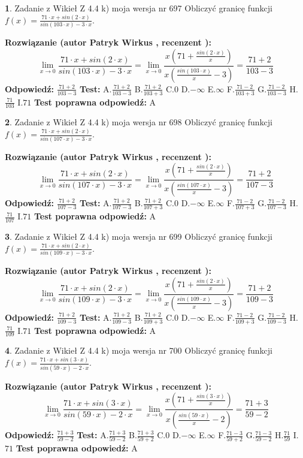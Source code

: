 \documentclass[12pt, a4paper]{article}
\theoremstyle{definition} %
\newtheorem{zad}{}
\newcommand{\zadStart}[1]{\begin{zad}#1\newline}
\newcommand{\zadStop}{\end{zad}}
\newcommand{\rozwStart}[2]{\noindent \textbf{Rozwiązanie (autor #1 , recenzent #2): }\newline}
\newcommand{\rozwStop}{\newline}
\newcommand{\odpStart}{\noindent \textbf{Odpowiedź:}\newline}
\newcommand{\odpStop}{\newline}
\newcommand{\testStart}{\noindent \textbf{Test:}\newline}
\newcommand{\testStop}{\newline}
\newcommand{\kluczStart}{\noindent \textbf{Test poprawna odpowiedź:}\newline}
\newcommand{\kluczStop}{\newline}
\begin{document}
\zadStart{Zadanie z Wikieł Z 4.4 k) moja wersja nr 697}
Obliczyć granicę funkcji $f(x)=\frac{71\cdot x +sin(2\cdot x)}{sin(103\cdot x) -3\cdot x}$.
\zadStop
\rozwStart{Patryk Wirkus}{}
$$\lim\limits_{x\to 0}\frac{71\cdot x +sin(2\cdot x)}{sin(103\cdot x) -3\cdot x}
=\lim\limits_{x\to 0}\frac{x(71+\frac{sin(2\cdot x)}{x})}{x(\frac{sin(103\cdot x)}{x}-3)}
=\frac{71+2}{103-3}$$
\rozwStop
\odpStart
$\frac{71+2}{103-3}$
\odpStop
\testStart
A.$\frac{71+2}{103-3}$
B.$\frac{71+2}{103+3}$
C.$0$
D.$-\infty$
E.$\infty$
F.$\frac{71-2}{103+3}$
G.$\frac{71-2}{103-3}$
H.$\frac{71}{103}$
I.$71$
\testStop
\kluczStart
A
\kluczStop



\zadStart{Zadanie z Wikieł Z 4.4 k) moja wersja nr 698}
Obliczyć granicę funkcji $f(x)=\frac{71\cdot x +sin(2\cdot x)}{sin(107\cdot x) -3\cdot x}$.
\zadStop
\rozwStart{Patryk Wirkus}{}
$$\lim\limits_{x\to 0}\frac{71\cdot x +sin(2\cdot x)}{sin(107\cdot x) -3\cdot x}
=\lim\limits_{x\to 0}\frac{x(71+\frac{sin(2\cdot x)}{x})}{x(\frac{sin(107\cdot x)}{x}-3)}
=\frac{71+2}{107-3}$$
\rozwStop
\odpStart
$\frac{71+2}{107-3}$
\odpStop
\testStart
A.$\frac{71+2}{107-3}$
B.$\frac{71+2}{107+3}$
C.$0$
D.$-\infty$
E.$\infty$
F.$\frac{71-2}{107+3}$
G.$\frac{71-2}{107-3}$
H.$\frac{71}{107}$
I.$71$
\testStop
\kluczStart
A
\kluczStop



\zadStart{Zadanie z Wikieł Z 4.4 k) moja wersja nr 699}
Obliczyć granicę funkcji $f(x)=\frac{71\cdot x +sin(2\cdot x)}{sin(109\cdot x) -3\cdot x}$.
\zadStop
\rozwStart{Patryk Wirkus}{}
$$\lim\limits_{x\to 0}\frac{71\cdot x +sin(2\cdot x)}{sin(109\cdot x) -3\cdot x}
=\lim\limits_{x\to 0}\frac{x(71+\frac{sin(2\cdot x)}{x})}{x(\frac{sin(109\cdot x)}{x}-3)}
=\frac{71+2}{109-3}$$
\rozwStop
\odpStart
$\frac{71+2}{109-3}$
\odpStop
\testStart
A.$\frac{71+2}{109-3}$
B.$\frac{71+2}{109+3}$
C.$0$
D.$-\infty$
E.$\infty$
F.$\frac{71-2}{109+3}$
G.$\frac{71-2}{109-3}$
H.$\frac{71}{109}$
I.$71$
\testStop
\kluczStart
A
\kluczStop



\zadStart{Zadanie z Wikieł Z 4.4 k) moja wersja nr 700}
Obliczyć granicę funkcji $f(x)=\frac{71\cdot x +sin(3\cdot x)}{sin(59\cdot x) -2\cdot x}$.
\zadStop
\rozwStart{Patryk Wirkus}{}
$$\lim\limits_{x\to 0}\frac{71\cdot x +sin(3\cdot x)}{sin(59\cdot x) -2\cdot x}
=\lim\limits_{x\to 0}\frac{x(71+\frac{sin(3\cdot x)}{x})}{x(\frac{sin(59\cdot x)}{x}-2)}
=\frac{71+3}{59-2}$$
\rozwStop
\odpStart
$\frac{71+3}{59-2}$
\odpStop
\testStart
A.$\frac{71+3}{59-2}$
B.$\frac{71+3}{59+2}$
C.$0$
D.$-\infty$
E.$\infty$
F.$\frac{71-3}{59+2}$
G.$\frac{71-3}{59-2}$
H.$\frac{71}{59}$
I.$71$
\testStop
\kluczStart
A
\kluczStop
\end{document}
